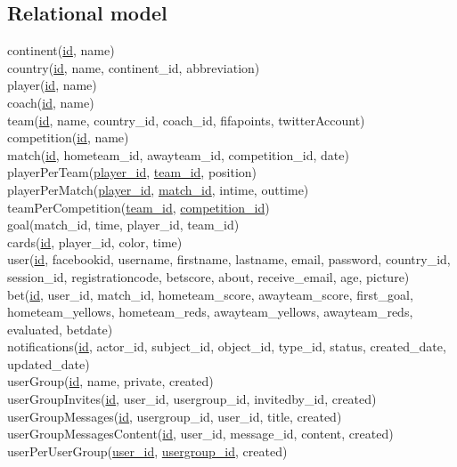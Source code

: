 \documentclass[11pt, a4paper]{article}
\begin{document}
\subsection{Relational model}
continent(\uline{id}, name) \\
country(\uline{id}, name, continent\_id, abbreviation) \\
player(\uline{id}, name) \\
coach(\uline{id}, name) \\
team(\uline{id}, name, country\_id, coach\_id, fifapoints, twitterAccount) \\
competition(\uline{id}, name) \\
match(\uline{id}, hometeam\_id, awayteam\_id, competition\_id, date) \\
playerPerTeam(\uline{player\_id}, \uline{team\_id}, position) \\
playerPerMatch(\uline{player\_id}, \uline{match\_id}, intime, outtime) \\
teamPerCompetition(\uline{team\_id}, \uline{competition\_id}) \\
goal(match\_id, time, player\_id, team\_id) \\
cards(\uline{id}, player\_id, color, time) \\
user(\uline{id}, facebookid, username, firstname, lastname, email, password, country\_id, session\_id, registrationcode, betscore, about, receive\_email, age, picture) \\
bet(\uline{id}, user\_id, match\_id, hometeam\_score, awayteam\_score, first\_goal, hometeam\_yellows, hometeam\_reds, awayteam\_yellows, awayteam\_reds, evaluated, betdate) \\
notifications(\uline{id}, actor\_id, subject\_id, object\_id, type\_id, status, created\_date, updated\_date) \\
userGroup(\uline{id}, name, private, created) \\
userGroupInvites(\uline{id}, user\_id, usergroup\_id, invitedby\_id, created) \\
userGroupMessages(\uline{id}, usergroup\_id, user\_id, title, created) \\
userGroupMessagesContent(\uline{id}, user\_id, message\_id, content, created) \\
userPerUserGroup(\uline{user\_id}, \uline{usergroup\_id}, created)\\
\end{document}
